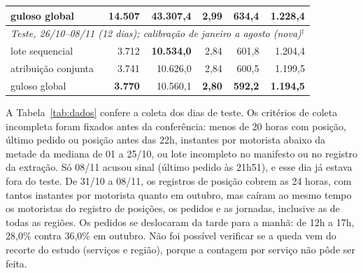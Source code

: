 \begin{table}[!htb]
\begin{tabular}{|l|r|r|r|r|r|}
\hline
guloso global & 14.507 & \textbf{43.307,4} & \textbf{2,99} & \textbf{634,4} & \textbf{1.228,4} \\
\hline
\multicolumn{6}{|l|}{\textit{Teste, 26/10--08/11 (12 dias); calibração de janeiro a agosto (nova)$^\dagger$}} \\
\hline
lote sequencial & 3.712 & \textbf{10.534,0} & 2,84 & 601,8 & 1.204,4 \\
\hline
atribuição conjunta & 3.741 & 10.626,0 & 2,84 & 600,5 & 1.199,5 \\
\hline
guloso global & \textbf{3.770} & 10.560,1 & \textbf{2,80} & \textbf{592,2} & \textbf{1.194,5} \\
\hline
\end{tabular}
\end{table}


A Tabela~\ref{tab:dados} confere a coleta dos dias de teste. Os critérios de coleta incompleta foram fixados antes da conferência: menos de 20 horas com posição, último pedido ou posição antes das 22h, instantes por motorista abaixo da metade da mediana de 01 a 25/10, ou lote incompleto no manifesto ou no registro da extração. Só 08/11 acusou sinal (último pedido às 21h51), e esse dia já estava fora do teste. De 31/10 a 08/11, os registros de posição cobrem as 24 horas, com tantos instantes por motorista quanto em outubro, mas caíram ao mesmo tempo os motoristas do registro de posições, os pedidos e as jornadas, inclusive as de todas as regiões. Os pedidos se deslocaram da tarde para a manhã: de 12h a 17h, 28,0\% contra 36,0\% em outubro. Não foi possível verificar se a queda vem do recorte do estudo (serviços e região), porque a contagem por serviço não pôde ser feita.

